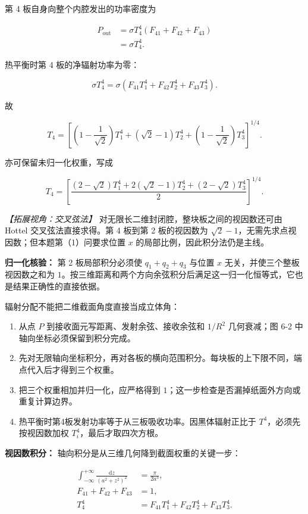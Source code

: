 \documentclass[12pt,a4paper,UTF8]{ctexart}
\newcommand{\tightlist}{\setlength{\itemsep}{0pt}\setlength{\parskip}{0pt}}
\begin{document}
第 4 板自身向整个内腔发出的功率密度为

\[\begin{aligned}
P_{\mathrm{out}}
&=\sigma T_4^4(F_{41}+F_{42}+F_{43})\\
&=\sigma T_4^4.
\end{aligned}\]

热平衡时第 4 板的净辐射功率为零：

\[\sigma T_4^4
=\sigma\left(F_{41}T_1^4+F_{42}T_2^4+F_{43}T_3^4\right).\]

故

\[\boxed{
T_4=
\left[
\left(1-\frac1{\sqrt2}\right)T_1^4
+(\sqrt2-1)T_2^4
+\left(1-\frac1{\sqrt2}\right)T_3^4
\right]^{1/4}
}.\]

亦可保留未归一化权重，写成

\[\boxed{
T_4=
\left[
\frac{(2-\sqrt2)T_1^4
+2(\sqrt2-1)T_2^4
+(2-\sqrt2)T_3^4}{2}
\right]^{1/4}
}.\]

\emph{【拓展视角：交叉弦法】}
对无限长二维封闭腔，整块板之间的视因数还可由 Hottel 交叉弦法直接求得。第
4 板到第 2 板的视因数为
\(\sqrt2-1\)，无需先求点视因数；但本题第（1）问要求位置 \(x\)
的局部比例，因此积分法仍是主线。

\textbf{归一化核验：} 第 2 板局部积分必须使 \(q_1+q_2+q_3\) 与位置 \(x\)
无关，并使三个整板视因数之和为
\(1\)。按三维距离和两个方向余弦积分后满足这一归一化恒等式，它也是结果正确性的直接依据。

辐射分配不能把二维截面角度直接当成立体角：

\begin{enumerate}
\def\labelenumi{\arabic{enumi}.}
\tightlist
\item
  从点 \(P\) 到接收面元写距离、发射余弦、接收余弦和 \(1/R^2\)
  几何衰减；图 6-2 中轴向坐标必须保留到积分完成。
\item
  先对无限轴向坐标积分，再对各板的横向范围积分。每块板的上下限不同，端点代入后才得到三个权重。
\item
  把三个权重相加并归一化，应严格得到
  \(1\)；这一步检查是否漏掉纸面外方向或重复计算边界。
\item
  热平衡时第4板发射功率等于从三板吸收功率。因黑体辐射正比于
  \(T^4\)，必须先按视因数加权 \(T_i^4\)，最后才取四次方根。
\end{enumerate}

\textbf{视因数积分：} 轴向积分是从三维几何降到截面权重的关键一步：

\[\begin{aligned}
\int_{-\infty}^{+\infty}
\frac{\mathrm dz}{(a^2+z^2)^2}
&=\frac{\pi}{2a^3},\\
F_{41}+F_{42}+F_{43}&=1,\\
T_4^4&=F_{41}T_1^4+F_{42}T_2^4+F_{43}T_3^4.
\end{aligned}\]
\end{document}
